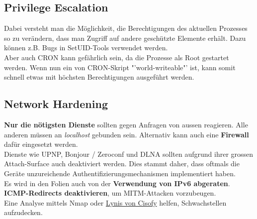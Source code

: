 \subsection{Privilege Escalation}
Dabei versteht man die Möglichkeit, die Berechtigungen des aktuellen Prozesses so zu verändern, dass man Zugriff auf andere geschützte Elemente erhält. Dazu können z.B. Bugs in SetUID-Tools verwendet werden.\\

Aber auch CRON kann gefährlich sein, da die Prozesse als Root gestartet werden. Wenn nun ein von CRON-Skript "'world-writeable"' ist, kann somit schnell etwas mit höchsten Berechtigungen ausgeführt werden.

\subsection{Network Hardening}
\textbf{Nur die nötigsten Dienste} sollten gegen Anfragen von aussen reagieren. Alle anderen müssen an \textit{localhost} gebunden sein. Alternativ kann auch eine \textbf{Firewall} dafür eingesetzt werden.\\
Dienste wie UPNP, Bonjour / Zeroconf und DLNA sollten aufgrund ihrer grossen Attach-Surface auch deaktiviert werden. Dies stammt daher, dass oftmals die Geräte unzureichende Authentifizierungsmechanismen implementiert haben.\\

Es wird in den Folien auch von der \textbf{Verwendung von IPv6 abgeraten}.\\

\textbf{ICMP-Redirects deaktivieren}, um MITM-Attacken vorzubeugen.\\

Eine Analyse mittels Nmap oder \href{https://cisofy.com/lynis/}{Lynis von Cisofy} helfen, Schwachstellen aufzudecken.

